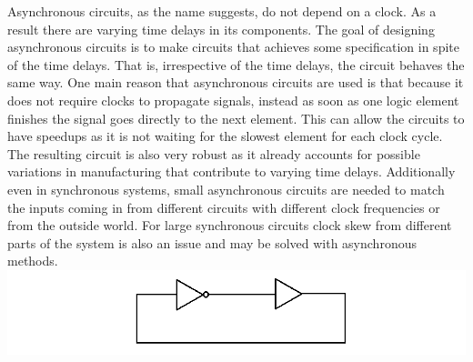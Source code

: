 \documentclass[12pt]{report}
\begin{document}
Asynchronous circuits, as the name suggests, do not depend on a clock. As a result there are varying time delays in its components. The goal of designing asynchronous circuits is to make circuits that achieves some specification in spite of the time delays. That is, irrespective of the time delays, the circuit behaves the same way. One main reason that asynchronous circuits are used is that because it does not require clocks to propagate signals, instead as soon as one logic element finishes the signal goes directly to the next element.  This can allow the circuits to have speedups as it is not waiting for the slowest element for each clock cycle.  The resulting circuit is also very robust as it already accounts for possible variations in manufacturing that contribute to varying time delays.  Additionally even in synchronous systems, small asynchronous circuits are needed to match the inputs coming in from different circuits with different clock frequencies or from the outside world.  For large synchronous circuits clock skew from different parts of the system is also an issue and may be solved with asynchronous methods. \\ %
\includegraphics[width=\textwidth]{asyncex}
\end{document}

